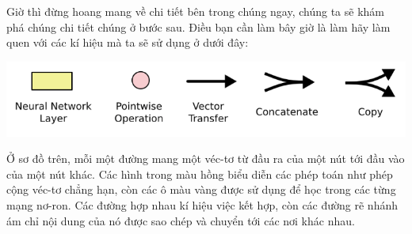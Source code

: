 Giờ thì đừng hoang mang về chi tiết bên trong chúng ngay, chúng ta sẽ khám phá chúng chi tiết chúng ở bước sau. Điều bạn cần làm bây giờ là làm hãy làm quen với các kí hiệu mà ta sẽ sử dụng ở dưới đây:
\begin{center}
    \includegraphics[scale=.3]{image/chapter6/lstm3.png}
    \begin{figure}[htp]
    \begin{center}
     
    \end{center}
    \end{figure}
\end{center}
Ở sơ đồ trên, mỗi một đường mang một véc-tơ từ đầu ra của một nút tới đầu vào của một nút khác. Các hình trong màu hồng biểu diễn các phép toán như phép cộng véc-tơ chẳng hạn, còn các ô màu vàng được sử dụng để học trong các từng mạng nơ-ron. Các đường hợp nhau kí hiệu việc kết hợp, còn các đường rẽ nhánh ám chỉ nội dung của nó được sao chép và chuyển tới các nơi khác nhau.


